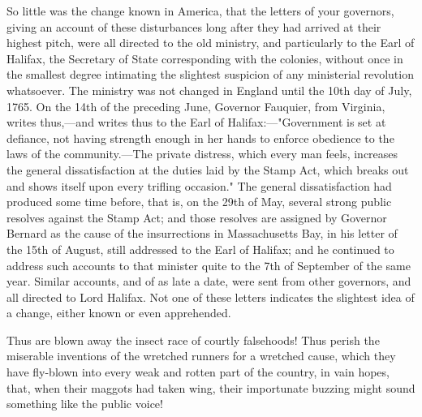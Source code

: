 So little was the change known in America, that the letters of your governors, giving an account of these disturbances long after they had arrived at their highest pitch, were all directed to the old ministry, and particularly to the Earl of Halifax, the Secretary of State corresponding with the colonies, without once in the smallest degree intimating the slightest suspicion of any ministerial revolution whatsoever. The ministry was not changed in England until the 10th day of July, 1765. On the 14th of the preceding June, Governor Fauquier, from Virginia, writes thus,—and writes thus to the Earl of Halifax:—"Government is set at defiance, not having strength enough in her hands to enforce obedience to the laws of the community.—The private distress, which every man feels, increases the general dissatisfaction at the duties laid by the Stamp Act, which breaks out and shows itself upon every trifling occasion." The general dissatisfaction had produced some time before, that is, on the 29th of May, several strong public resolves against the Stamp Act; and those resolves are assigned by Governor Bernard as the cause of the insurrections in Massachusetts Bay, in his letter of the 15th of August, still addressed to the Earl of Halifax; and he continued to address such accounts to that minister quite to the 7th of September of the same year. Similar accounts, and of as late a date, were sent from other governors, and all directed to Lord Halifax. Not one of these letters indicates the slightest idea of a change, either known or even apprehended.

Thus are blown away the insect race of courtly falsehoods! Thus perish the miserable inventions of the wretched runners for a wretched cause, which they have fly-blown into every weak and rotten part of the country, in vain hopes, that, when their maggots had taken wing, their importunate buzzing might sound something like the public voice!

